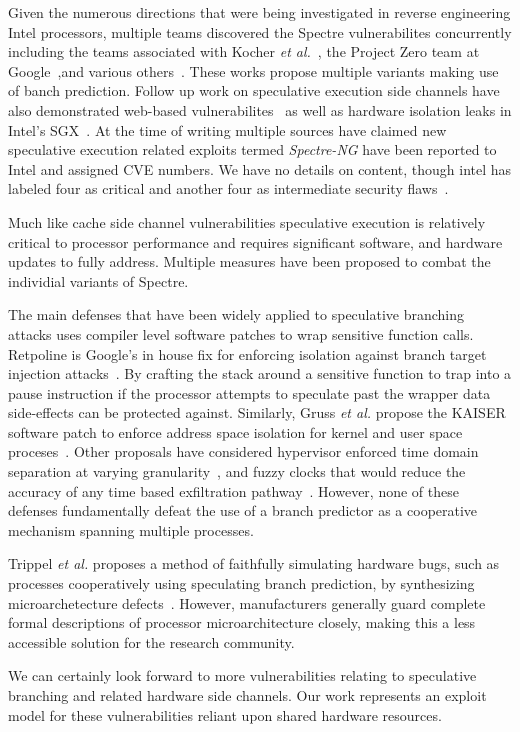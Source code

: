 Given the numerous directions that were being investigated in reverse engineering 
Intel processors, multiple teams discovered the Spectre vulnerabilites concurrently including 
the teams associated with Kocher \textit{et al.}~\cite{spectre}, the Project Zero team 
at Google~\cite{project_zero},and various others~\cite{evtyushkin2018branchscope,maisuradze2018speculose}. 
These works propose multiple variants making use of banch prediction.  Follow 
up work on speculative execution side channels have also demonstrated
web-based vulnerabilites~\cite{genkin2018drive} as well as hardware isolation  
leaks in Intel's SGX~\cite{spectre_sgx}. At the time of writing multiple sources
have claimed new speculative execution related exploits termed \textit{Spectre-NG}
have been reported to Intel and assigned CVE numbers. We have no details
on content, though intel has labeled four as critical and another four 
as intermediate security flaws~\cite{spectre_ng_gossip}.  


Much like cache side channel vulnerabilities speculative execution is relatively
critical to processor performance and requires significant software, and hardware 
updates to fully address. Multiple measures have been proposed to combat the 
individial variants of Spectre.   

The main defenses that have been widely applied to 
speculative branching attacks uses compiler level software patches to wrap sensitive 
function calls. Retpoline is Google's in house fix for enforcing 
isolation against branch target injection attacks~\cite{retpoline}. By crafting 
the stack around a sensitive function to trap into a pause instruction if the processor 
attempts to speculate past the wrapper data side-effects can be protected against. 
Similarly, Gruss \textit{et al.} propose the KAISER software patch to enforce address space
isolation for kernel and user space proceses~\cite{gruss2017kaslr}. 
Other proposals have considered hypervisor enforced time domain separation at varying 
granularity~\cite{renau2018securing}, and fuzzy clocks that would reduce the accuracy 
of any time based exfiltration pathway~\cite{hu1992reducing}. However, none of these defenses 
fundamentally defeat the use of a branch predictor as a cooperative mechanism
spanning multiple processes. 

Trippel \textit{et al.} proposes a method of faithfully simulating 
hardware bugs, such as processes cooperatively using speculating branch prediction,
by synthesizing microarchetecture defects~\cite{trippel2018meltdownprime}. However, 
manufacturers generally guard complete formal descriptions of processor microarchitecture closely, 
making this a less accessible solution for the research community.

\smallskip

We can certainly look forward to more vulnerabilities relating to speculative 
branching and related hardware side channels. Our work represents an exploit 
model for these vulnerabilities reliant upon shared hardware resources. 



